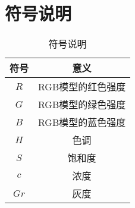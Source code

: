 \section{符号说明}

\begin{table}[H]
    \centering
    \caption{符号说明}
    \begin{tabular}{@{}cc@{}}
    \toprule
    符号       & 意义         \\ \midrule
    $R$      & RGB模型的红色强度        \\
    $G$      & RGB模型的绿色强度       \\
    $B$      & RGB模型的蓝色强度  \\
    $H$      & 色调       \\
    $S$      & 饱和度  \\
    $c$   & 浓度   \\
    $Gr$   & 灰度      \\ \bottomrule
    \end{tabular}
\end{table}